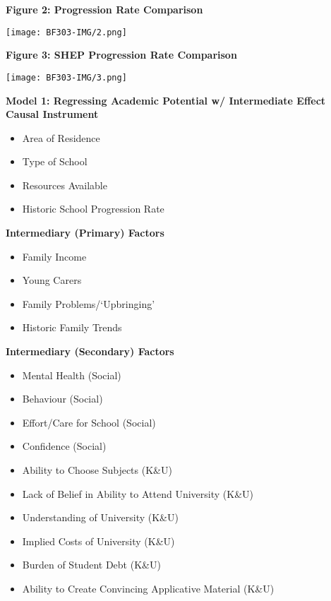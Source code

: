 \documentclass[11pt, english]{article}
\begin{document}
	\textbf{Figure 2: Progression Rate Comparison}

        \begin{center}
                \texttt{[image: BF303-IMG/2.png]}
        \end{center}

	\textbf{Figure 3: SHEP Progression Rate Comparison}

        \begin{center}
                \texttt{[image: BF303-IMG/3.png]}
        \end{center}

	\newpage

	\textbf{Model 1: Regressing Academic Potential w/ Intermediate Effect}\\

	\textbf{Causal Instrument}
	\begin{itemize}
	\setlength\itemsep{0cm}
		\item Area of Residence
		\item Type of School
		\item Resources Available
		\item Historic School Progression Rate
	\end{itemize}

	\textbf{Intermediary (Primary) Factors}
	\begin{itemize}
        \setlength\itemsep{0cm}            
                \item Family Income 
                \item Young Carers
                \item Family Problems/`Upbringing'
                \item Historic Family Trends
        \end{itemize}

	\textbf{Intermediary (Secondary) Factors}
	\begin{itemize}                               
        \setlength\itemsep{0cm}            
                \item Mental Health (Social)
                \item Behaviour (Social)
                \item Effort/Care for School (Social)
                \item Confidence (Social)
                \item Ability to Choose Subjects (K\&U)
                \item Lack of Belief in Ability to Attend University (K\&U)
                \item Understanding of University (K\&U)
                \item Implied Costs of University (K\&U)
		\item Burden of Student Debt (K\&U)
		\item Ability to Create Convincing Applicative Material (K\&U)
        \end{itemize}
\end{document}
